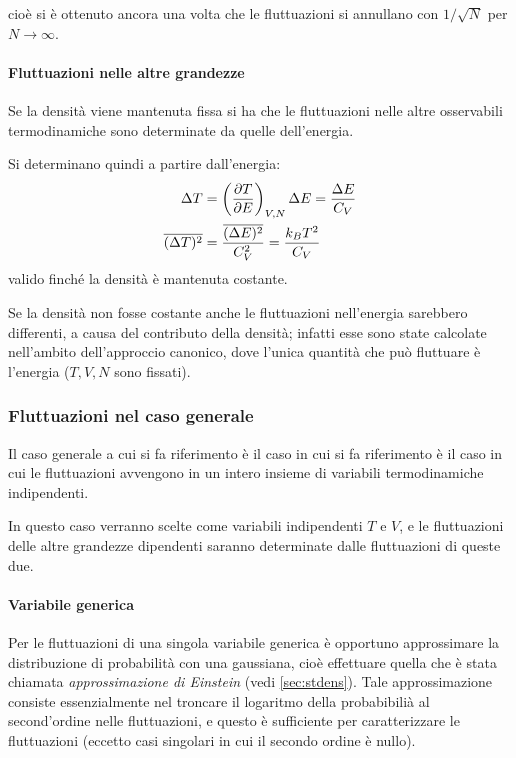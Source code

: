\noindent cioè si è ottenuto ancora una volta che le fluttuazioni si annullano con $1/\sqrt{N}$ per $N \rightarrow \infty$.

\paragraph{Fluttuazioni nelle altre grandezze} Se la densità viene mantenuta fissa si ha che le fluttuazioni nelle altre osservabili termodinamiche sono determinate da quelle dell'energia.

\begin{es}
	Si determinano quindi a partire dall'energia:
	\begin{align*}
		\Delta T &= \left(\frac{\partial {T}}{\partial {E}}\right)_{V,N} \Delta E = \frac{\Delta E}{C_V}\\
		\overline{(\Delta T)^2} &= \frac{\overline{(\Delta E)^2}}{C_V^2} = \frac{k_B T^2}{C_V}
	\end{align*}
	valido finché la densità è mantenuta costante.
\end{es}

\noindent Se la densità non fosse costante anche le fluttuazioni nell'energia sarebbero differenti, a causa del contributo della densità; infatti esse sono state calcolate nell'ambito dell'approccio canonico, dove l'unica quantità che può fluttuare è l'energia ($T,V,N$ sono fissati).

\subsubsection{Fluttuazioni nel caso generale}
Il caso generale a cui si fa riferimento è il caso in cui si fa riferimento è il caso in cui le fluttuazioni avvengono in un intero insieme di variabili termodinamiche indipendenti.

\noindent In questo caso verranno scelte come variabili indipendenti $T$ e $V$, e le fluttuazioni delle altre grandezze dipendenti saranno determinate dalle fluttuazioni di queste due.

\paragraph{Variabile generica} Per le fluttuazioni di una singola variabile generica è opportuno approssimare la distribuzione di probabilità con una gaussiana, cioè effettuare quella che è stata chiamata \textit{approssimazione di Einstein} (vedi \cref{sec:stdens}). Tale approssimazione consiste essenzialmente nel troncare il logaritmo della probabibilià al second'ordine nelle fluttuazioni, e questo è sufficiente per caratterizzare le fluttuazioni (eccetto casi singolari in cui il secondo ordine è nullo).

